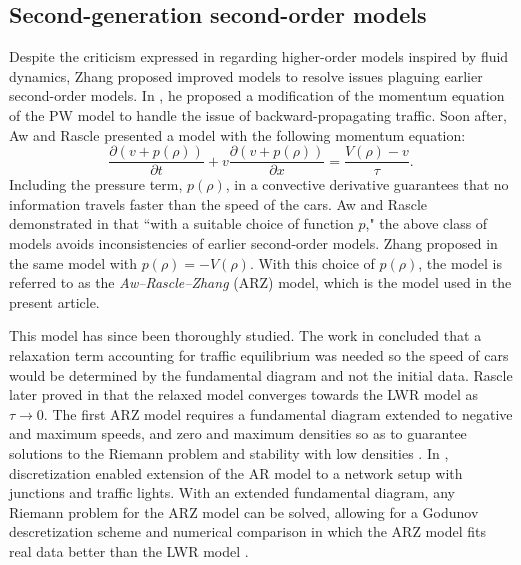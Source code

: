 \documentclass[preprint]{elsarticle}
\begin{document}
\subsection{Second-generation second-order models}
Despite the criticism expressed in \cite{Dag_requiem} regarding higher-order models inspired by fluid dynamics, Zhang proposed improved models to resolve issues plaguing earlier second-order models. In \cite{Zhang1998}, he proposed a modification of the momentum equation of the PW model to handle the issue of backward-propagating traffic.
Soon after, Aw and Rascle \cite{AR} presented a model with the following momentum equation:
\begin{equation} \label{ARZEq}
\frac{\partial\left(v+p\left(\rho\right)\right)}{\partial t}+v\frac{\partial\left(v+p\left(\rho\right)\right)}{\partial x}=\frac{V(\rho)-v}{\tau}.
\end{equation}
Including the pressure term, $p(\rho)$, in a convective derivative guarantees that no information travels faster than the speed of the cars. Aw and Rascle demonstrated in \cite{AR} that ``with a suitable choice of function $p$," the above class of models avoids inconsistencies of earlier second-order models. Zhang proposed in \cite{Z} the same model with $p(\rho) = -V(\rho)$. With this choice of $p(\rho)$, the model is referred to as the \textit{Aw--Rascle--Zhang} (ARZ) model, which is the model used in the present article.

This model has since been thoroughly studied. The work in
\cite{AR} concluded that a relaxation term accounting for traffic
equilibrium was needed so the speed of cars would be determined by
the fundamental diagram and not the initial data. Rascle later proved in \cite{R_improved} that the relaxed model converges towards the LWR model as $\tau \rightarrow 0$. The first ARZ model requires a fundamental diagram extended to negative and maximum speeds, and zero and maximum densities so as to guarantee
solutions to the Riemann problem and stability with low densities \cite{Lebacque2007}. In \cite{HybridLagrangian2007}, 
discretization enabled extension of the AR model to a network setup with junctions and traffic lights. With an extended fundamental diagram, any Riemann problem for the ARZ model can be solved, allowing for a Godunov descretization scheme and numerical comparison
in which the ARZ model fits real data better than the LWR model \cite{GodunovARZ}.
\end{document}
